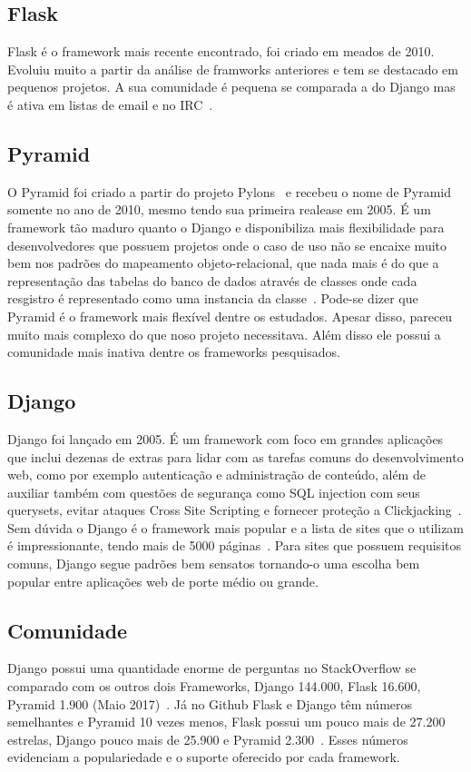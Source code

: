 \documentclass[a4paper, 12pt, oneside]{book}
\begin{document}
\subsection{Flask}
Flask é o framework mais recente encontrado, foi criado em meados de 2010. Evoluiu muito a partir da análise de framworks anteriores e tem se destacado em pequenos projetos. A sua comunidade é pequena se comparada a do Django mas é ativa em listas de email e no IRC~\cite{ryanbrown}. 

\subsection{Pyramid}
O Pyramid foi criado a partir do projeto Pylons~\cite{pylonsproject} e recebeu o nome de Pyramid somente no ano de 2010, mesmo tendo sua primeira realease em 2005. É um framework tão maduro quanto o Django e disponibiliza mais flexibilidade para desenvolvedores que possuem projetos onde o caso de uso não se encaixe muito bem nos padrões do mapeamento objeto-relacional, que nada mais é do que a representação das tabelas do banco de dados através de classes onde cada resgistro é representado como uma instancia da classe~\cite{pyramid}. Pode-se dizer que Pyramid é o framework mais flexível dentre os estudados. Apesar disso, pareceu muito mais complexo do que noso projeto necessitava. Além disso ele possui a comunidade mais inativa dentre os frameworks pesquisados.

\subsection{Django}
Django foi lançado em 2005. É um framework com foco em grandes aplicações que inclui dezenas de extras para lidar com as tarefas comuns do desenvolvimento web, como por exemplo autenticação e administração de conteúdo, além de auxiliar também com questões de segurança como SQL injection com seus querysets, evitar ataques Cross Site Scripting e fornecer proteção a Clickjacking~\cite{django}. Sem dúvida o Django é o framework mais popular e a lista de sites que o utilizam é impressionante, tendo mais de 5000 páginas~\cite{listadjangosites}. Para sites que possuem requisitos comuns, Django segue padrões bem sensatos tornando-o uma escolha bem popular entre aplicações web de porte médio ou grande.

\subsection{Comunidade}
Django possui uma quantidade enorme de perguntas no StackOverflow se comparado com os outros dois Frameworks, Django 144.000, Flask 16.600, Pyramid 1.900 (Maio 2017)~\cite{stackoverflowtags}. Já no Github Flask e Django têm números semelhantes e Pyramid 10 vezes menos, Flask possui um pouco mais de 27.200 estrelas, Django pouco mais de 25.900 e Pyramid 2.300~\cite{github}. Esses números evidenciam a populariedade e o suporte oferecido por cada framework.
\end{document}
